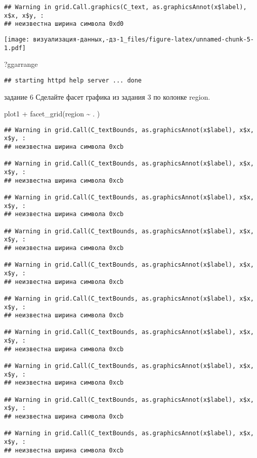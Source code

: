 \documentclass[
]{article}
\newenvironment{Shaded}{\begin{snugshade}}{\end{snugshade}}
\newcommand{\FunctionTok}[1]{\textcolor[rgb]{0.00,0.00,0.00}{#1}}
\newcommand{\NormalTok}[1]{#1}
\newcommand{\SpecialCharTok}[1]{\textcolor[rgb]{0.00,0.00,0.00}{#1}}
\begin{document}
\begin{verbatim}
## Warning in grid.Call.graphics(C_text, as.graphicsAnnot(x$label), x$x, x$y, :
## неизвестна ширина символа 0xd0
\end{verbatim}

\texttt{[image: визуализация-данных,-дз-1\_files/figure-latex/unnamed-chunk-5-1.pdf]}

\begin{Shaded}
\begin{Highlighting}[]
\NormalTok{?ggarrange}
\end{Highlighting}
\end{Shaded}

\begin{verbatim}
## starting httpd help server ... done
\end{verbatim}

задание 6 Сделайте фасет графика из задания 3 по колонке region.

\begin{Shaded}
\begin{Highlighting}[]
\NormalTok{plot1 }\SpecialCharTok{+} \FunctionTok{facet\_grid}\NormalTok{(region }\SpecialCharTok{\textasciitilde{}}\NormalTok{ . )}
\end{Highlighting}
\end{Shaded}

\begin{verbatim}
## Warning in grid.Call(C_textBounds, as.graphicsAnnot(x$label), x$x, x$y, :
## неизвестна ширина символа 0xcb

## Warning in grid.Call(C_textBounds, as.graphicsAnnot(x$label), x$x, x$y, :
## неизвестна ширина символа 0xcb

## Warning in grid.Call(C_textBounds, as.graphicsAnnot(x$label), x$x, x$y, :
## неизвестна ширина символа 0xcb

## Warning in grid.Call(C_textBounds, as.graphicsAnnot(x$label), x$x, x$y, :
## неизвестна ширина символа 0xcb

## Warning in grid.Call(C_textBounds, as.graphicsAnnot(x$label), x$x, x$y, :
## неизвестна ширина символа 0xcb

## Warning in grid.Call(C_textBounds, as.graphicsAnnot(x$label), x$x, x$y, :
## неизвестна ширина символа 0xcb

## Warning in grid.Call(C_textBounds, as.graphicsAnnot(x$label), x$x, x$y, :
## неизвестна ширина символа 0xcb

## Warning in grid.Call(C_textBounds, as.graphicsAnnot(x$label), x$x, x$y, :
## неизвестна ширина символа 0xcb

## Warning in grid.Call(C_textBounds, as.graphicsAnnot(x$label), x$x, x$y, :
## неизвестна ширина символа 0xcb

## Warning in grid.Call(C_textBounds, as.graphicsAnnot(x$label), x$x, x$y, :
## неизвестна ширина символа 0xcb
\end{verbatim}
\end{document}
